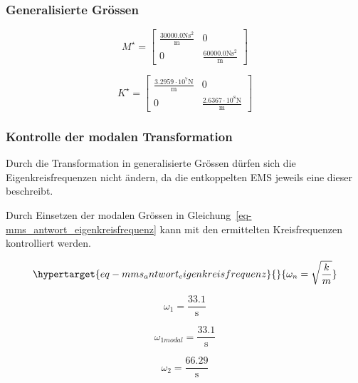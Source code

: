 \documentclass[
  letterpaper,
  DIV=11]{scrreprt}
\begin{document}
\hypertarget{generalisierte-gruxf6ssen-2}{%
\subsubsection{Generalisierte
Grössen}\label{generalisierte-gruxf6ssen-2}}

\begin{equation}M^{\star} = \left[\begin{matrix}\frac{30000.0 \text{N} \text{s}^{2}}{\text{m}} & 0\\0 & \frac{60000.0 \text{N} \text{s}^{2}}{\text{m}}\end{matrix}\right]\end{equation}

\begin{equation}K^{\star} = \left[\begin{matrix}\frac{3.2959 \cdot 10^{7} \text{N}}{\text{m}} & 0\\0 & \frac{2.6367 \cdot 10^{8} \text{N}}{\text{m}}\end{matrix}\right]\end{equation}

\hypertarget{kontrolle-der-modalen-transformation-2}{%
\subsubsection{Kontrolle der modalen
Transformation}\label{kontrolle-der-modalen-transformation-2}}

Durch die Transformation in generalisierte Grössen dürfen sich die
Eigenkreisfrequenzen nicht ändern, da die entkoppelten EMS jeweils eine
dieser beschreibt.

Durch Einsetzen der modalen Grössen in
Gleichung~\ref{eq-mms_antwort_eigenkreisfrequenz} kann mit den
ermittelten Kreisfrequenzen kontrolliert werden.

\begin{equation}\protect\hypertarget{eq-mms_antwort_eigenkreisfrequenz}{}{
\omega_n = \sqrt{\frac{k}{m}}
}\label{eq-mms_antwort_eigenkreisfrequenz}\end{equation}

\begin{equation}\omega_{1} = \frac{33.1}{\text{s}}\end{equation}

\begin{equation}\omega_{1 modal} = \frac{33.1}{\text{s}}\end{equation}

\begin{equation}\omega_{2} = \frac{66.29}{\text{s}}\end{equation}
\end{document}
